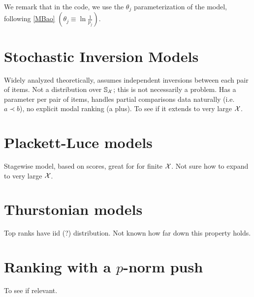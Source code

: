 \documentclass[10pt]{article}
\newcommand\bl{\left(}
\newcommand\br{\right)}
\begin{document}
We remark that in the code, we use the $\theta_j$ parameterization of the model, following \ref{MBao} $\bl \theta_j \equiv \ln{\frac{1}{p_j}} \br$.
\section{Stochastic Inversion Models}
\label{sec:stoch-i-m}
Widely analyzed theoretically, assumes independent inversions between each pair of items. Not a distribution over ${\mathbb S}_{{\mathcal X}}$; this is not necessarily a problem. Has a parameter per pair of items, handles partial comparisons data naturally (i.e. $a \prec b$), no explicit modal ranking (a plus). To see if it extends to very large ${\mathcal X}$. 


\section{Plackett-Luce models}
\label{sec:pl}
Stagewise model, based on scores, great for \topt for finite ${\mathcal X}$. Not sure how to expand to very large ${\mathcal X}$. 

\section{Thurstonian models}
\label{sec:thurst}
Top ranks have iid (?) distribution. Not known how far down this property holds.
\section{Ranking with a $p$-norm push}
\label{sec:push}
To see if relevant.

\appendix
    
\end{document}
